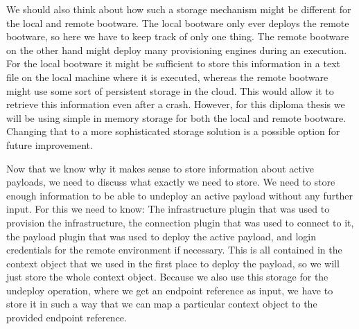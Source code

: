 We should also think about how such a storage mechanism might be different for the local and remote bootware.
The local bootware only ever deploys the remote bootware, so here we have to keep track of only one thing.
The remote bootware on the other hand might deploy many provisioning engines during an execution.
For the local bootware it might be sufficient to store this information in a text file on the local machine where it is executed, whereas the remote bootware might use some sort of persistent storage in the cloud.
This would allow it to retrieve this information even after a crash.
However, for this diploma thesis we will be using simple in memory storage for both the local and remote bootware.
Changing that to a more sophisticated storage solution is a possible option for future improvement.

Now that we know why it makes sense to store information about active payloads, we need to discuss what exactly we need to store.
We need to store enough information to be able to undeploy an active payload without any further input.
For this we need to know: The infrastructure plugin that was used to provision the infrastructure, the connection plugin that was used to connect to it, the payload plugin that was used to deploy the active payload, and login credentials for the remote environment if necessary.
This is all contained in the context object that we used in the first place to deploy the payload, so we will just store the whole context object.
Because we also use this storage for the undeploy operation, where we get an endpoint reference as input, we have to store it in such a way that we can map a particular context object to the provided endpoint reference.
